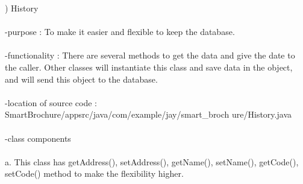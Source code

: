 \documentclass[conference]{IEEEtran}
\begin{document}
) History\\\\
-purpose : To make it easier and flexible to keep the database.\\
\\ -functionality : There are several methods to get the data and give the date to the caller. Other classes will instantiate this class and save data in the object, and will send this object to the database.\\
\\ -location of source code : SmartBrochure/appsrc/java/com/example/jay/smart\_broch
ure/History.java\\
\\ -class components\\
\\ a. This class has getAddress(), setAddress(), getName(), setName(), getCode(), setCode() method to make the flexibility higher.\\
\end{document}
